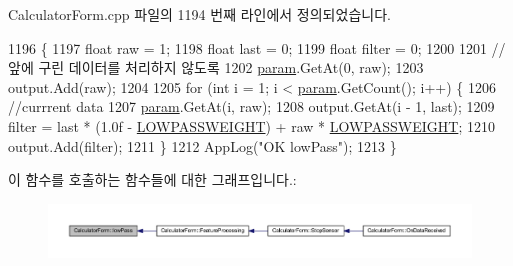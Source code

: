 Calculator\+Form.\+cpp 파일의 1194 번째 라인에서 정의되었습니다.


\begin{DoxyCode}
1196                                                       \{
1197     \textcolor{keywordtype}{float} raw = 1;
1198     \textcolor{keywordtype}{float} last = 0;
1199     \textcolor{keywordtype}{float} filter = 0;
1200 
1201 \textcolor{comment}{//앞에 구린 데이터를 처리하지 않도록}
1202     \hyperlink{structsvm__model_a95f43f398a173e63d0ce26911d0a9273}{param}.GetAt(0, raw);
1203     output.Add(raw);
1204 
1205     \textcolor{keywordflow}{for} (\textcolor{keywordtype}{int} i = 1; i < \hyperlink{structsvm__model_a95f43f398a173e63d0ce26911d0a9273}{param}.GetCount(); i++) \{
1206         \textcolor{comment}{//currrent data}
1207         \hyperlink{structsvm__model_a95f43f398a173e63d0ce26911d0a9273}{param}.GetAt(i, raw);
1208         output.GetAt(i - 1, last);
1209         filter = last * (1.0f - \hyperlink{_calculator_form_8cpp_a6e36f77342e4ad6a98212d3ba1f857ed}{LOWPASSWEIGHT}) + raw * 
      \hyperlink{_calculator_form_8cpp_a6e36f77342e4ad6a98212d3ba1f857ed}{LOWPASSWEIGHT};
1210         output.Add(filter);
1211     \}
1212     AppLog(\textcolor{stringliteral}{"OK lowPass"});
1213 \}
\end{DoxyCode}


이 함수를 호출하는 함수들에 대한 그래프입니다.\+:
\nopagebreak
\begin{figure}[H]
\begin{center}
\leavevmode
\includegraphics[width=350pt]{class_calculator_form_a7219388d7692193e44e149d822035231_icgraph}
\end{center}
\end{figure}


